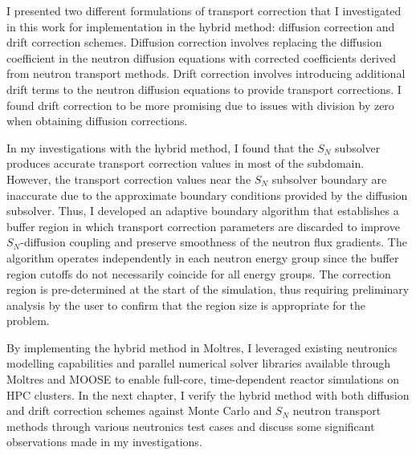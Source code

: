 I presented two different formulations of transport correction that I investigated in this work for
implementation in the hybrid method: diffusion correction and drift correction schemes. Diffusion
correction involves replacing the diffusion coefficient in the neutron diffusion equations with
corrected coefficients derived from neutron transport methods. Drift correction involves
introducing additional drift terms to the neutron diffusion equations to provide transport
corrections. I found drift correction to be more promising due to issues with division by zero when
obtaining diffusion corrections.

In my investigations with the hybrid method, I found that the $S_N$ subsolver produces
accurate transport correction values in most of the subdomain. However, the transport correction
values near the $S_N$ subsolver boundary are inaccurate due to the approximate boundary conditions
provided by the diffusion subsolver. Thus, I developed an adaptive boundary algorithm that
establishes a buffer region in which transport correction parameters are discarded to improve
$S_N$-diffusion coupling and preserve smoothness of the neutron flux gradients. The algorithm
operates independently in each neutron energy group since the buffer region cutoffs
do not necessarily coincide for all energy groups. The
correction region is pre-determined at the start of the simulation, thus requiring preliminary
analysis by the user to confirm that the region size is appropriate for the problem.

By implementing the hybrid method in Moltres, I leveraged existing neutronics modelling
capabilities and parallel numerical solver libraries available through Moltres and \gls{MOOSE} to
enable full-core, time-dependent reactor simulations on \gls{HPC} clusters.
In the next chapter, I verify the hybrid method with both diffusion and drift correction schemes
against Monte Carlo and $S_N$ neutron transport
methods through various neutronics test cases and discuss some significant observations made in my
investigations.
